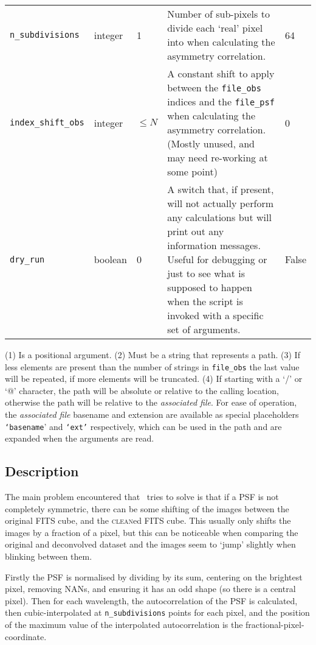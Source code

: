 \begin{table}[h!]
\begin{tabular}{l|l|l|p{50mm}|p{30mm}}
	\verb|n_subdivisions|
	& integer
	& 1
	& Number of sub-pixels to divide each `real' pixel into when calculating the asymmetry correlation.
	& 64
	\\
	
	\verb|index_shift_obs|
	& integer
	& $\leq N$\sups{(3)}
	& A constant shift to apply between the \verb|file_obs| indices and the \verb|file_psf| when calculating the asymmetry correlation. (Mostly unused, and may need re-working at some point)
	& 0
	\\
	
	\verb|dry_run|
	& boolean
	& 0
	& A switch that, if present, will not actually perform any calculations but will print out any information messages. Useful for debugging or just to see what is supposed to happen when the script is invoked with a specific set of arguments.
	& False
	
	
\end{tabular}
{
	\footnotesize
	(1) Is a positional argument. 
	(2) Must be a string that represents a path. 
	(3) If less elements are present than the number of strings in \verb|file_obs| the last value will be repeated, if more elements will be truncated. 
	(4) If starting with a `/' or `@' character, the path will be absolute or relative to the calling location, otherwise the path will be relative to the \emph{associated file}. For ease of operation, the \emph{associated file} basename and extension are available as special placeholders \texttt{`{\la}basename{\ra}}' and \texttt{`{\la}ext{\ra}'} respectively, which can be used in the path and are expanded when the arguments are read.
}
	
\end{table}



\subsection{Description}
The main problem encountered that \asympyfile ~tries to solve is that if a PSF is not completely symmetric, there can be some shifting of the images between the original FITS cube, and the \textsc{clean}ed FITS cube. This usually only shifts the images by a fraction of a pixel, but this can be noticeable when comparing the original and deconvolved dataset and the images seem to `jump' slightly when blinking between them.

Firstly the PSF is normalised by dividing by its sum, centering on the brightest pixel, removing NANs, and ensuring it has an odd shape (so there is a central pixel). Then for each wavelength, the autocorrelation of the PSF is calculated, then cubic-interpolated at \verb|n_subdivisions| points for each pixel, and the position of the  maximum value of the interpolated autocorrelation is the fractional-pixel-coordinate.

